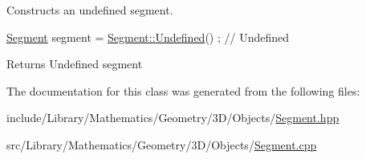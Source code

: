 Constructs an undefined segment. 


\begin{DoxyCode}
\hyperlink{classlibrary_1_1math_1_1geom_1_1d3_1_1objects_1_1_segment_a5562342d1edf2f52e37ce1bc138ee7d7}{Segment} segment = \hyperlink{classlibrary_1_1math_1_1geom_1_1d3_1_1objects_1_1_segment_a3b2505e9553ba0067f8184120c106602}{Segment::Undefined}() ; \textcolor{comment}{// Undefined}
\end{DoxyCode}


\begin{DoxyReturn}{Returns}
Undefined segment 
\end{DoxyReturn}


The documentation for this class was generated from the following files\+:\begin{DoxyCompactItemize}
\item 
include/\+Library/\+Mathematics/\+Geometry/3\+D/\+Objects/\hyperlink{3_d_2_objects_2_segment_8hpp}{Segment.\+hpp}\item 
src/\+Library/\+Mathematics/\+Geometry/3\+D/\+Objects/\hyperlink{3_d_2_objects_2_segment_8cpp}{Segment.\+cpp}\end{DoxyCompactItemize}
